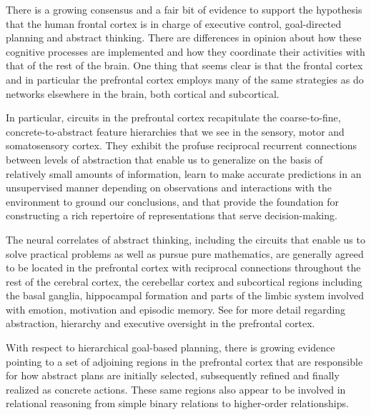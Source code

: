 

There is a growing consensus and a fair bit of evidence to support the hypothesis that the human frontal cortex is in charge of executive control, goal-directed planning and abstract thinking. There are differences in opinion about how these cognitive processes are implemented and how they coordinate their activities with that of the rest of the brain. One thing that seems clear is that the frontal cortex and in particular the prefrontal cortex employs many of the same strategies as do networks elsewhere in the brain, both cortical and subcortical.

In particular, circuits in the prefrontal cortex recapitulate the coarse-to-fine, concrete-to-abstract feature hierarchies that we see in the sensory, motor and somatosensory cortex. They exhibit the profuse reciprocal recurrent connections between levels of abstraction that enable us to generalize on the basis of relatively small amounts of information, learn to make accurate predictions in an unsupervised manner depending on observations and interactions with the environment to ground our conclusions, and that provide the foundation for constructing a rich repertoire of representations that serve decision-making.

The neural correlates of abstract thinking, including the circuits that enable us to solve practical problems as well as pursue pure mathematics, are generally agreed to be located in the prefrontal cortex with reciprocal connections throughout the rest of the cerebral cortex, the cerebellar cortex and subcortical regions including the basal ganglia, hippocampal formation and parts of the limbic system involved with emotion, motivation and episodic memory. See {} for more detail regarding abstraction, hierarchy and executive oversight in the prefrontal cortex.


 


With respect to hierarchical goal-based planning, there is growing evidence pointing to a set of adjoining regions in the prefrontal cortex that are responsible for how abstract plans are initially selected, subsequently refined and finally realized as concrete actions. These same regions also appear to be involved in relational reasoning from simple binary relations to higher-order relationships.

